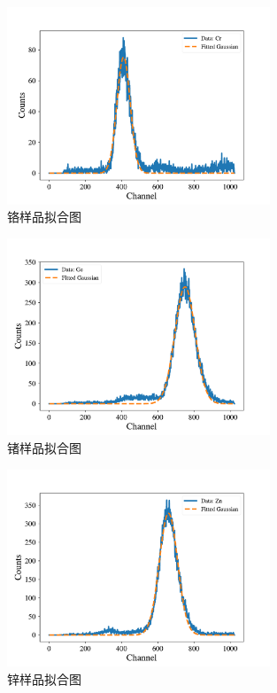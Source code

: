 \documentclass{article}
\begin{document}
    \begin{figure}[htbp]
        \centering
        \includegraphics[width=0.7\textwidth]{../plot/Fitted_Cr.pdf}
        \caption{铬样品拟合图\label{fig:Fitted_Cr}}
    \end{figure}
    \begin{figure}[htbp]
        \centering
        \includegraphics[width=0.7\textwidth]{../plot/Fitted_Ge.pdf}
        \caption{锗样品拟合图\label{fig:Fitted_Ge}}
    \end{figure}
    \begin{figure}[htbp]
        \centering
        \includegraphics[width=0.7\textwidth]{../plot/Fitted_Zn.pdf}
        \caption{锌样品拟合图\label{fig:Fitted_Zn}}
    \end{figure}
\end{document}
